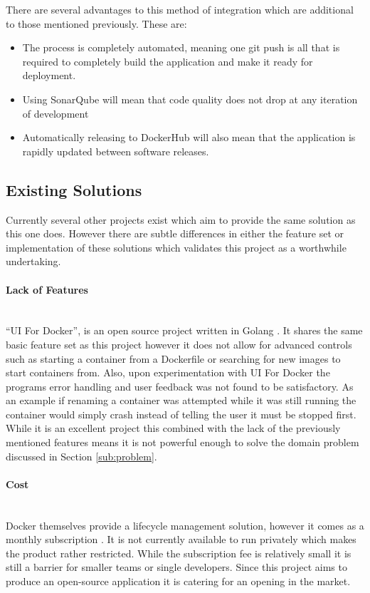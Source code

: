 There are several advantages to this method of integration which are additional to those mentioned previously. These are:

\begin{itemize}
	\item The process is completely automated, meaning one git push is all that is required to completely build the application and make it ready for deployment.
	\item Using SonarQube will mean that code quality does not drop at any iteration of development
	\item Automatically releasing to DockerHub will also mean that the application is rapidly updated between software releases.
\end{itemize} 

\subsection{Existing Solutions}
Currently several other projects exist which aim to provide the same solution as this one does. However there are subtle differences in either the feature set or implementation of these solutions which validates this project as a worthwhile undertaking. 

\paragraph{Lack of Features}\mbox{}\\
``UI For Docker'', is an open source project written in Golang \citep{UIRepo2016}. It shares the same basic feature set as this project however it does not allow for advanced controls such as starting a container from a Dockerfile or searching for new images to start containers from. Also, upon experimentation with UI For Docker the programs error handling and user feedback was not found to be satisfactory. As an example if renaming a container was attempted while it was still running the container would simply crash instead of telling the user it must be stopped first. While it is an excellent project this combined with the lack of the previously mentioned features means it is not powerful enough to solve the domain problem discussed in Section \ref{sub:problem}. 

\paragraph{Cost}\mbox{}\\
Docker themselves provide a \gls{lifecycle management} solution, however it comes as a monthly subscription \citep{Docker2016}. It is not currently available to run privately which makes the product rather restricted. While the subscription fee is relatively small it is still a barrier for smaller teams or single developers. Since this project aims to produce an open-source application it is catering for an opening in the market.
